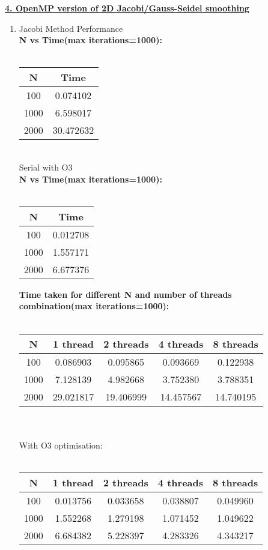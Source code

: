 \documentclass[12pt,letterpaper]{article}
\begin{document}
\underline{\textbf{4. OpenMP version of 2D Jacobi/Gauss-Seidel smoothing}} \\
\begin{enumerate}

    \item Jacobi Method Performance \\
  
    \textbf{N vs Time(max iterations=1000):} \\\\
    \begin{tabular}{ |c|c| } 
 \hline
  N & Time  \\ 
 \hline \hline 
  100    &  0.074102  \\
  1000 & 6.598017  \\
  2000 & 30.472632 \\ 
\hline 
\end{tabular}
\\
 Serial with O3\\
    \textbf{N vs Time(max iterations=1000):} \\\\
    \begin{tabular}{ |c|c| } 
 \hline
  N & Time  \\ 
 \hline \hline 
  100    &  0.012708  \\
  1000 & 1.557171  \\
  2000 & 6.677376 \\ 
\hline 
\end{tabular}
  
    
    \textbf{Time taken for different N and number of threads combination(max iterations=1000):} \\\\
\begin{tabular}{ |c|c|c|c|c| } 
 \hline
  N & 1 thread & 2 threads & 4 threads & 8 threads  \\ 
 \hline \hline 
  100 & 0.086903 & 0.095865   & 0.093669 &  0.122938 \\
  1000 & 7.128139 & 4.982668 & 3.752380 & 3.788351 \\
  2000 & 29.021817 & 19.406999 & 14.457567 & 14.740195 \\
 
\hline 
\end{tabular}
\\\\
With O3 optimisation: \\\
\begin{tabular}{ |c|c|c|c|c| } 
 \hline
  N & 1 thread & 2 threads & 4 threads & 8 threads  \\ 
 \hline \hline 
  100 & 0.013756 & 0.033658  &  0.038807 & 0.049960 \\
  1000 & 1.552268 & 1.279198 & 1.071452 & 1.049622 \\
  2000 & 6.684382 & 5.228397 & 4.283326 &  4.343217 \\
 

\end{tabular}
\end{enumerate}
\end{document}
